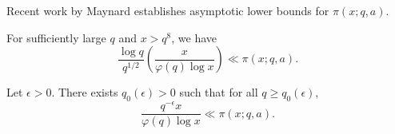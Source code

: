 Recent work by Maynard \cite{maynard_2013} establishes asymptotic lower bounds for $\pi(x;q,a)$.

\begin{theorem}
For sufficiently large $q$ and $x>q^8$, we have
$$\frac{\log q}{q^{1/2}}\left(\frac x{\varphi(q)\log x}\right)\ll\pi(x;q,a).$$
\end{theorem}

\begin{theorem}
Let $\epsilon>0$. There exists $q_0(\epsilon)>0$ such that for all $q\geq q_0(\epsilon)$,
$$\frac{q^{-\epsilon}x}{\varphi(q)\log x}\ll\pi(x;q,a).$$
\end{theorem}
